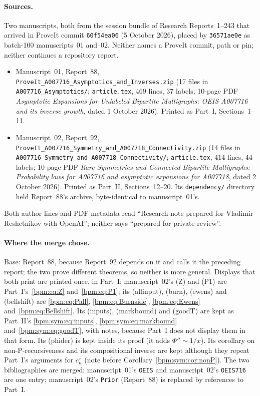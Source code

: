 \documentclass[11pt,a4paper]{article}
\theoremstyle{remark}\newtheorem{remark}[theorem]{Remark}%
\begin{document}
\paragraph{Sources.} Two manuscripts, both from the session bundle of
Research Reports~1--243 that arrived in ProveIt commit
\texttt{60f54ea06} (5 October 2026), placed by \texttt{36571ae0e} as
batch-100 manuscripts~01 and~02. Neither names a ProveIt commit, path or
pin; neither continues a repository report.
\begin{itemize}
\item Manuscript~01, Report~88, \nolinkurl{ProveIt_A007716_Asymptotics_and_Inverses.zip}
(17 files in \nolinkurl{A007716_Asymptotics/}; \nolinkurl{article.tex}, 469 lines,
37 labels; 10-page PDF \emph{Asymptotic Expansions for Unlabeled Bipartite
Multigraphs: OEIS A007716 and its inverse growth}, dated 1 October 2026).
Printed as Part~I, Sections~1--11.
\item Manuscript~02, Report~92, \nolinkurl{ProveIt_A007716_Symmetry_and_A007718_Connectivity.zip}
(14 files in \nolinkurl{A007716_Symmetry_and_A007718_Connectivity/};
\nolinkurl{article.tex}, 414 lines, 44 labels; 10-page PDF \emph{Rare
Symmetries and Connected Bipartite Multigraphs: Probability laws for
A007716 and asymptotic expansions for A007718}, dated 2 October 2026).
Printed as Part~II, Sections~12--20. Its \nolinkurl{dependency/} directory held
Report~88's archive, byte-identical to manuscript~01's.
\end{itemize}
Both author lines and PDF metadata read ``Research note prepared for
Vladimir Reshetnikov with OpenAI''; neither says ``prepared for private
review''.

\paragraph{Where the merge chose.} Base: Report~88, because Report~92
depends on it and calls it the preceding report; the two prove different
theorems, so neither is more general. Displays that both print are printed
once, in Part~I: manuscript~02's (Z) and (P1) are Part~I's~\eqref{bpm:eq:Z}
and~\eqref{bpm:eq:P1}; its (allinput), (burn), (ewens) and (bellshift) are
\eqref{bpm:eq:Pall}, \eqref{bpm:eq:Burnside}, \eqref{bpm:eq:Ewens}
and~\eqref{bpm:eq:Bellshift}. Its (inputs), (markbound) and (goodT) are kept
as Part~II's \eqref{bpm:sym:eq:inputs}, \eqref{bpm:sym:eq:markbound}
and~\eqref{bpm:sym:eq:goodT}, with notes, because Part~I does not display
them in that form. Its (phider) is kept inside its proof (it adds
$\Phi''\sim1/x$). Its corollary on non-P-recursiveness and its
compositional inverse are kept although they repeat Part~I's arguments for
$c^\circ_n$ (note before Corollary~\ref{bpm:sym:cor:nonP}). The two bibliographies are merged:
manuscript~01's \texttt{OEIS} and manuscript~02's \texttt{OEIS716} are one
entry; manuscript~02's \texttt{Prior} (Report~88) is replaced by references
to Part~I.
\end{document}
